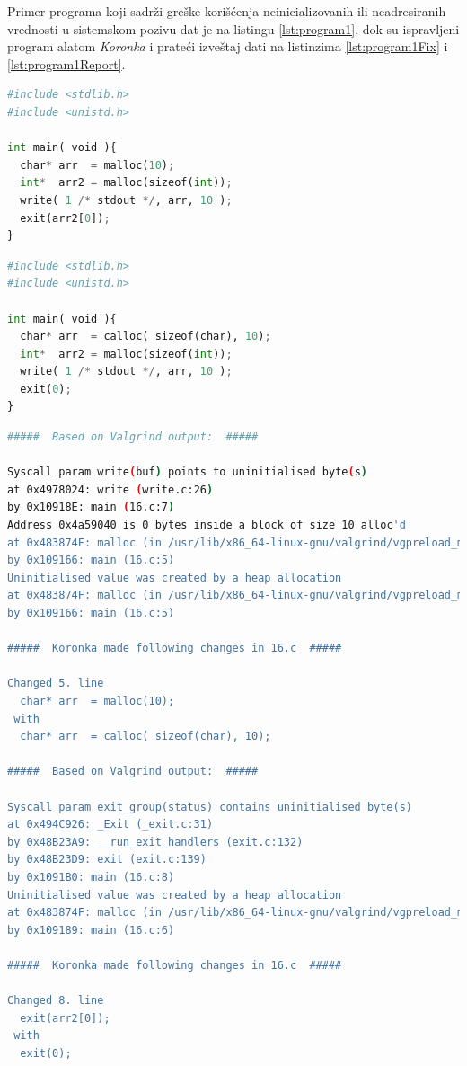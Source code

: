 \documentclass[12pt,oneside]{memoir}
\theoremstyle{plain}
\theoremstyle{definition}
\begin{document}
\newpage
Primer programa koji sadrži greške korišćenja neinicializovanih ili neadresiranih vrednosti u sistemskom pozivu dat je na listingu \ref{lst:program1}, dok su ispravljeni program alatom \textit{Koronka} i prateći izveštaj dati na listinzima \ref{lst:program1Fix} i \ref{lst:program1Report}.

\begin{lstlisting}[style=mystyle,caption={Program koji sadrži greške korišćenja neinicializovanih ili neadresiranih vrednosti u sistemskom pozivu}, label={lst:program1},language={Python}] 
#include <stdlib.h>
#include <unistd.h>

int main( void ){
  char* arr  = malloc(10);
  int*  arr2 = malloc(sizeof(int));
  write( 1 /* stdout */, arr, 10 );
  exit(arr2[0]);
}
\end{lstlisting}

\begin{lstlisting}[style=mystyle,caption={Predlog rešenja alata \textit{Koronka} za greške otkrivene u programu sa listinga \ref{lst:program1}}, label={lst:program1Fix},language={Python}] 
#include <stdlib.h>
#include <unistd.h>

int main( void ){
  char* arr  = calloc( sizeof(char), 10);
  int*  arr2 = malloc(sizeof(int));
  write( 1 /* stdout */, arr, 10 );
  exit(0);
}
\end{lstlisting}

\begin{lstlisting}[style=terminal,caption={Izveštaj o radu alata \textit{Koronka} za program sa listinga \ref{lst:program1}}, label={lst:program1Report},language={bash}]   
#####  Based on Valgrind output:  #####

Syscall param write(buf) points to uninitialised byte(s)
at 0x4978024: write (write.c:26)
by 0x10918E: main (16.c:7)
Address 0x4a59040 is 0 bytes inside a block of size 10 alloc'd
at 0x483874F: malloc (in /usr/lib/x86_64-linux-gnu/valgrind/vgpreload_memcheck-amd64-linux.so)
by 0x109166: main (16.c:5)
Uninitialised value was created by a heap allocation
at 0x483874F: malloc (in /usr/lib/x86_64-linux-gnu/valgrind/vgpreload_memcheck-amd64-linux.so)
by 0x109166: main (16.c:5)

#####  Koronka made following changes in 16.c  #####

Changed 5. line 
  char* arr  = malloc(10);
 with 
  char* arr  = calloc( sizeof(char), 10);

#####  Based on Valgrind output:  #####

Syscall param exit_group(status) contains uninitialised byte(s)
at 0x494C926: _Exit (_exit.c:31)
by 0x48B23A9: __run_exit_handlers (exit.c:132)
by 0x48B23D9: exit (exit.c:139)
by 0x1091B0: main (16.c:8)
Uninitialised value was created by a heap allocation
at 0x483874F: malloc (in /usr/lib/x86_64-linux-gnu/valgrind/vgpreload_memcheck-amd64-linux.so)
by 0x109189: main (16.c:6)

#####  Koronka made following changes in 16.c  #####

Changed 8. line 
  exit(arr2[0]);
 with 
  exit(0);
\end{lstlisting}
\end{document}

